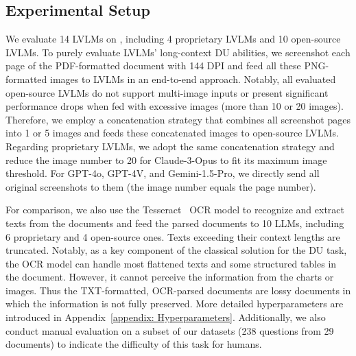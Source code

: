 \subsection{Experimental Setup}
We evaluate 14 LVLMs on \benchmarkname, including 4 proprietary LVLMs and 10 open-source LVLMs. To purely evaluate LVLMs' long-context DU abilities, we screenshot each page of the PDF-formatted document with 144 DPI and feed all these PNG-formatted images to LVLMs in an end-to-end approach. Notably, all evaluated open-source LVLMs do not support multi-image inputs or present significant performance drops when fed with excessive images (\eg more than 10 or 20 images). Therefore, we employ a concatenation strategy that combines all screenshot pages into 1 or 5 images and feeds these concatenated images to open-source LVLMs. Regarding proprietary LVLMs, we adopt the same concatenation strategy and reduce the image number to 20 for Claude-3-Opus to fit its maximum image threshold. For GPT-4o, GPT-4V, and Gemini-1.5-Pro, we directly send all original screenshots to them (\ie the image number equals the page number).

For comparison, we also use the Tesseract~\cite{smith2007overview} OCR model to recognize and extract texts from the documents and feed the parsed documents to 10 LLMs, including 6 proprietary and 4 open-source ones. Texts exceeding their context lengths are truncated. Notably, as a key component of the classical solution for the DU task, the OCR model can handle most flattened texts and some structured tables in the document. However, it cannot perceive the information from the charts or images. Thus the TXT-formatted, OCR-parsed documents are lossy documents in which the information is not fully preserved. More detailed hyperparameters are introduced in Appendix~\ref{appendix: Hyperparameters}. Additionally, we also conduct manual evaluation on a subset of our datasets (238 questions from 29 documents) to indicate the difficulty of this task for humans.

